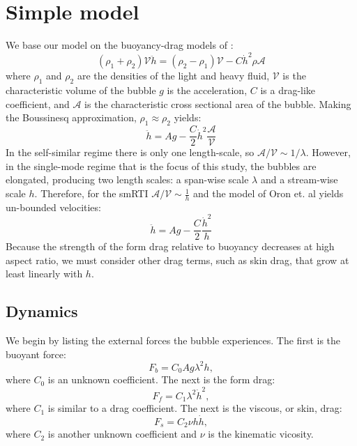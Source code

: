 \section{Simple model}

We base our model on the buoyancy-drag models of \cite{Oron2001}:
\begin{equation}
(\rho_1 + \rho_2) \mathcal{V} \ddot{h} = (\rho_2 - \rho_1) \mathcal{V} - C \dot{h}^2 \rho \mathcal{A}
\end{equation}
where $\rho_1$ and $\rho_2$ are the densities of the light and heavy fluid,
$\mathcal{V}$ is the characteristic volume of the bubble
$g$ is the acceleration,
$C$ is a drag-like coefficient, and
$\mathcal{A}$ is the characteristic cross sectional area of the bubble.
Making the Boussinesq approximation, $\rho_1 \approx \rho_2$ yields:
\begin{equation}
\ddot{h} = A g - \frac{C}{2} \dot{h}^2 \frac{\mathcal{A}}{\mathcal{V}}
\end{equation}
In the self-similar regime there is only one length-scale, so $\mathcal{A}/\mathcal{V} \sim 1 / \lambda$.
However, in the single-mode regime that is the focus of this study, the bubbles are elongated, producing two length scales: a span-wise scale $\lambda$ and a stream-wise scale $h$.
Therefore, for the smRTI $\mathcal{A}/\mathcal{V} \sim \frac{1}{h}$ and the model of Oron et. al yields un-bounded velocities:
\begin{equation}
\ddot{h} = A g - \frac{C}{2} \frac{\dot{h}^2}{h}
\end{equation}
Because the strength of the form drag relative to buoyancy decreases at high aspect ratio, we must consider other drag terms, such as skin drag, that grow at least linearly with $h$.

\subsection{Dynamics}

We begin by listing the external forces the bubble experiences.  The first is the buoyant force:
\begin{equation}
F_b = C_0 A g \lambda^2 h,
\end{equation}
where $C_0$ is an unknown coefficient.
The next is the form drag:
\begin{equation}
F_f = C_1 \lambda^2 \dot{h}^2,
\end{equation}
where $C_1$ is similar to a drag coefficient.
The next is the viscous, or skin, drag:
\begin{equation}
F_s = C_2 \nu h \dot{h},
\end{equation}
where $C_2$ is another unknown coefficient and 
$\nu$ is the kinematic vicosity.

